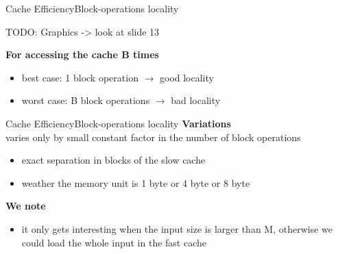 
\begin{frame}{Cache Efficiency}{Block-operations locality}
	
	TODO: Graphics -> look at slide 13 \vspace{2em}
	
	\textbf{For accessing the cache B times}
	\begin{itemize}
		\item
			best case: 1 block operation $\rightarrow$ good locality
		\item
			worst case: B block operations $\rightarrow$ bad locality
	\end{itemize}
\end{frame}


\begin{frame}{Cache Efficiency}{Block-operations locality}
	\textbf{Variations}\\
	varies only by small constant factor in the number of block operations
	\begin{itemize}
		\item
		exact separation in blocks of the slow cache 
		\item
		weather the memory unit is 1 byte or 4 byte or 8 byte
	\end{itemize}
	\textbf{We note}\\
	\begin{itemize}
		\item
		it only gets interesting when the input size is larger than M, otherwise 
		we could load the whole input in the fast cache
	\end{itemize}
\end{frame}


